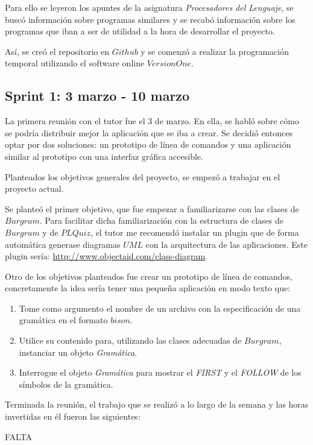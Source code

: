 Para ello se leyeron los apuntes de la asignatura \textit{Procesadores del Lenguaje}, se buscó información sobre programas similares y se recabó información sobre los programas que iban a ser de utilidad a la hora de desarrollar el proyecto.

Así, se creó el repositorio en $Github$ y se comenzó a realizar la programación temporal utilizando el software online $VersionOne$. 

\subsection{Sprint 1: 3 marzo - 10 marzo}

La primera reunión con el tutor fue el 3 de marzo. En ella, se habló sobre cómo se podría distribuir mejor la aplicación que se iba a crear. Se decidió entonces optar por dos soluciones: un prototipo de línea de comandos y una aplicación similar al prototipo con una interfaz gráfica accesible.

Planteados los objetivos generales del proyecto, se empezó a trabajar en el proyecto actual. 

Se planteó el primer objetivo, que fue empezar a familiarizarse con las clases de $Burgram$. Para facilitar dicha familiarización  con la estructura de clases de $Burgram$ y de $PLQuiz$, el tutor me recomendó instalar un plugin que de forma automática generase diagramas $UML$ con la arquitectura de las aplicaciones. Este plugin sería: \url{http://www.objectaid.com/class-diagram}.

Otro de los objetivos planteados fue crear un prototipo de línea de comandos, concretamente la idea sería tener una pequeña aplicación en modo texto que:

\begin{enumerate}
\item Tome como argumento el nombre de un archivo con la especificación de una gramática en el formato $bison$.
\item Utilice su contenido para, utilizando las clases adecuadas de $Burgram$, instanciar un objeto \textit{Gramática}.
\item Interrogue el objeto \textit{Gramática} para mostrar el \textit{FIRST} y el \textit{FOLLOW} de los símbolos de la gramática.
\end{enumerate}

Terminada la reunión, el trabajo que se realizó a lo largo de la semana y las horas invertidas en él fueron las siguientes:

FALTA 

